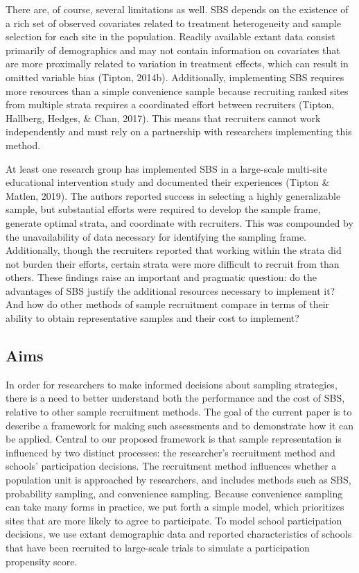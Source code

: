 \documentclass[
  english,
  man,floatsintext]{apa6}
\begin{document}
There are, of course, several limitations as well. SBS depends on the existence of a rich set of observed covariates related to treatment heterogeneity and sample selection for each site in the population. Readily available extant data consist primarily of demographics and may not contain information on covariates that are more proximally related to variation in treatment effects, which can result in omitted variable bias (Tipton, 2014b). Additionally, implementing SBS requires more resources than a simple convenience sample because recruiting ranked sites from multiple strata requires a coordinated effort between recruiters (Tipton, Hallberg, Hedges, \& Chan, 2017). This means that recruiters cannot work independently and must rely on a partnership with researchers implementing this method.

At least one research group has implemented SBS in a large-scale multi-site educational intervention study and documented their experiences (Tipton \& Matlen, 2019). The authors reported success in selecting a highly generalizable sample, but substantial efforts were required to develop the sample frame, generate optimal strata, and coordinate with recruiters.
This was compounded by the unavailability of data necessary for identifying the sampling frame.
Additionally, though the recruiters reported that working within the strata did not burden their efforts, certain strata were more difficult to recruit from than others.
These findings raise an important and pragmatic question: do the advantages of SBS justify the additional resources necessary to implement it?
And how do other methods of sample recruitment compare in terms of their ability to obtain representative samples and their cost to implement?

\hypertarget{aims}{%
\subsection{Aims}\label{aims}}

In order for researchers to make informed decisions about sampling strategies, there is a need to better understand both the performance and the cost of SBS, relative to other sample recruitment methods.
The goal of the current paper is to describe a framework for making such assessments and to demonstrate how it can be applied.
Central to our proposed framework is that sample representation is influenced by two distinct processes: the researcher's recruitment method and schools' participation decisions.
The recruitment method influences whether a population unit is approached by researchers, and includes methods such as SBS, probability sampling, and convenience sampling.
Because convenience sampling can take many forms in practice, we put forth a simple model, which prioritizes sites that are more likely to agree to participate.
To model school participation decisions, we use extant demographic data and reported characteristics of schools that have been recruited to large-scale trials to simulate a participation propensity score.
\end{document}
